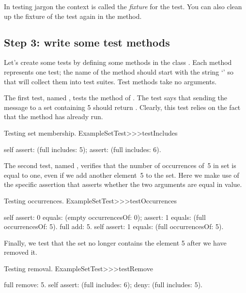 \documentclass[a4paper,10pt,twoside]{book}
\begin{document}
\noindent
In testing jargon the context is called the \emph{fixture} for the test.
You can also clean up the fixture of the test again in the  method.

\subsection{Step 3: write some test methods}

Let's create some tests by defining some methods in the class .
Each method represents one test; the name of the method should start with the string `' so that \sunit will collect them into test suites.
Test methods take no arguments.

The first test, named , tests the  method of .  The test says that sending the message  to a set containing 5 should return .
Clearly, this test relies on the fact that the  method has already run.

\begin{method}[testIncludes]{Testing set membership.}
ExampleSetTest>>>testIncludes

	self
		assert: (full includes: 5);
		assert: (full includes: 6).
\end{method}

The second test, named , verifies that the number of occurrences of~5 in  set is equal to one, even if we add another element~5 to the set. Here we make use of the specific assertion  that asserts whether the two arguments are equal in value.

\begin{method}[testOccurrences]{Testing occurrences.}
ExampleSetTest>>>testOccurrences

	self
		assert: 0 equals: (empty occurrencesOf: 0);
		assert: 1 equals: (full occurrencesOf: 5).
	full add: 5.
	self assert: 1 equals: (full occurrencesOf: 5).
\end{method}

Finally, we test that the set no longer contains the element 5 after we have removed it.

\begin{method}[testRemove]{Testing removal.}
ExampleSetTest>>>testRemove

	full remove: 5.
	self
		assert: (full includes: 6);
		deny: (full includes: 5).
\end{method}
\end{document}
